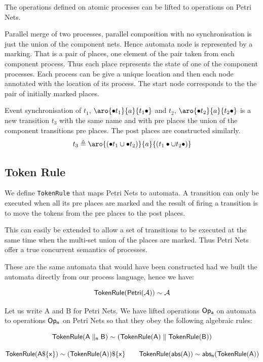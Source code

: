 \documentclass[]{article}
\begin{document}
The operations defined on atomic processes can be lifted to operations on Petri Nets.

Parallel merge of two processes, parallel composition with no synchronisation is just the union of the component nets. Hence automata node is represented by a marking. That is a pair of places, one element of the pair taken from each component process. Thus each place represents the state of one of the component processes. Each process can be give a unique location and then each node annotated with the location of its process.
The start node corresponds to the the pair of initially marked places.

Event synchronisation of $t_1$, $\aro{\bullet t_1}{a}{t_1\bullet}$ and $t_2$, $\aro{\bullet t_2}{a}{t_2\bullet}$ is a new transition $t_3$ with the same name and with pre places the union of the component transitions pre places. The post places are constructed similarly.
\[t_3\triangleq \aro{(\bullet t_1\cup \bullet t_2)}{a}{(t_1\bullet \cup t_2\bullet) }\]




\subsection{Token Rule}


 We define \verb|TokenRule| that maps Petri Nets to automata.  A transition can only be executed when all its pre places are marked and the result of firing a transition is to move the tokens from the pre places to the post places.
 
 This can easily be extended to allow a set of transitions to be executed at the same time when the multi-set union of the places are marked. Thus Petri Nets offer a {\sf true concurrent } semantics of processes.
 
 
 
  These are the same automata that would have been constructed had we built the automata directly from our process language, hence we have:

\[{\sf TokenRule(Petri(\mathcal{A}))\sim  \mathcal{A}}\]

Let us write {\sf A} and {\sf B} for Petri Nets. We have   lifted   operations ${\sf Op_a}$ on automata to   operations ${\sf Op_n}$ on Petri Nets  so that they obey  the following algebraic rules:

\[{\sf TokenRule({\sf A}\parallel_n {\sf B})\sim  (TokenRule({\sf A})\parallel TokenRule({\sf B})) }\]

\[{\sf TokenRule({\sf A}\$\{x\}) \sim  (TokenRule({\sf A}))\$\{x\}  \qquad     TokenRule(abs({\sf A}))\sim  abs_n(TokenRule({\sf A})) }\]
\end{document}
